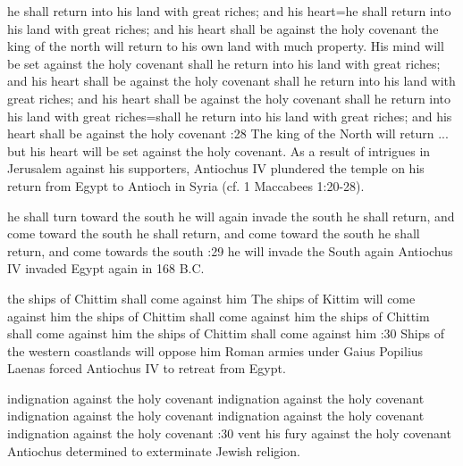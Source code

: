     {he shall return into his land with great riches; and his heart}={he shall return into his land with great riches; and his heart shall be against the holy covenant} %
    {the king of the north will return to his own land with much property. His mind will be set against the holy covenant} %
    {shall he return into his land with great riches; and his heart shall be against the holy covenant} %
    {shall he return into his land with great riches; and his heart shall be against the holy covenant} %
    {shall he return into his land with great riches}={shall he return into his land with great riches; and his heart shall be against the holy covenant} %
:28 {The king of the North will return ... but his heart will be set against the holy covenant.} 
As a result of intrigues in Jerusalem against his supporters, Antiochus IV plundered the temple on his return from Egypt to Antioch in Syria (cf. 1 Maccabees  1:20-28).

    {he shall turn toward the south} %
    {he will again invade the south} %
    {he shall return, and come toward the south} %
    {he shall return, and come toward the south} %
    {he shall return, and come towards the south} %
:29 {he will invade the South again} Antiochus IV invaded  Egypt again in 168 B.C.

    {the ships of Chittim shall come against him} %
    {The ships of Kittim will come against him} %
    {the ships of Chittim shall come against him} %
    {the ships of Chittim shall come against him} %
    {the ships of Chittim shall come against him} %
:30 {Ships of the western coastlands will oppose him} Roman armies under Gaius Popilius Laenas
forced Antiochus IV to retreat from Egypt.

    {indignation against the holy covenant} %
    {indignation against the holy covenant} %
    {indignation against the holy covenant} %
    {indignation against the holy covenant} %
    {indignation against the holy covenant} %
:30 {vent his fury against the holy covenant} Antiochus determined to exterminate Jewish religion.

